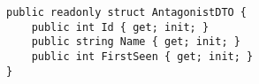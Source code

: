 
\begin{lstlisting}
public readonly struct AntagonistDTO {
    public int Id { get; init; }
    public string Name { get; init; }
    public int FirstSeen { get; init; }
}
\end{lstlisting}
